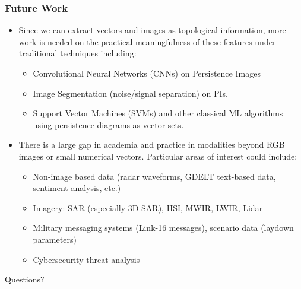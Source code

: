 \documentclass[10pt]{beamer}
\begin{document}
	\begin{frame}
		\frametitle{Future Work}
		
		\begin{itemize}
			\item Since we can extract vectors and images as topological information, more work is needed on the practical meaningfulness of these features under traditional techniques including:
				\begin{itemize}
					\item Convolutional Neural Networks (CNNs) on Persistence Images
					\item Image Segmentation (noise/signal separation) on PIs.
					\item Support Vector Machines (SVMs) and other classical ML algorithms using persistence diagrams as vector sets.
				\end{itemize}
			\item There is a large gap in academia and practice in modalities beyond RGB images or small numerical vectors. Particular areas of interest could include:
				\begin{itemize}
					\item Non-image based data (radar waveforms, GDELT text-based data, sentiment analysis, etc.)
					\item Imagery: SAR (especially 3D SAR), HSI, MWIR, LWIR, Lidar
					\item Military messaging systems (Link-16 messages), scenario data (laydown parameters)
					\item Cybersecurity threat analysis
				\end{itemize}
		\end{itemize}
	\end{frame}

	\begin{frame}
		\Huge{\centerline{Questions?}}
	\end{frame}
\end{document}
